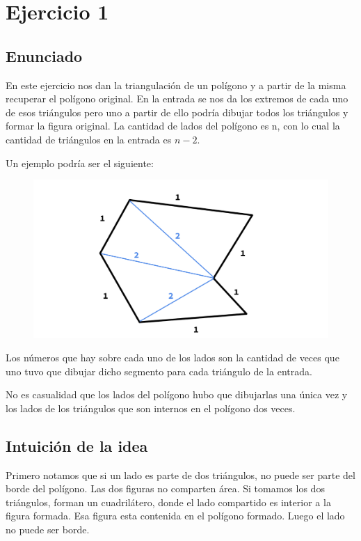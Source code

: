 \section{Ejercicio 1}

\subsection{Enunciado}

En este ejercicio nos dan la triangulación de un polígono y a partir de la misma recuperar el polígono original. En la entrada se nos da los extremos de cada uno de esos triángulos pero uno a partir de ello podría dibujar todos los triángulos y formar la figura original. La cantidad de lados del polígono es n, con lo cual la cantidad de triángulos en la entrada es $n-2$.\newline

Un ejemplo podría ser el siguiente:\newline

\begin{figure}[h!]
	\centering
	\includegraphics[scale = 0.25]{img/poligono-triangulado.png}
\end{figure}

Los números que hay sobre cada uno de los lados son la cantidad de veces que uno tuvo que dibujar dicho segmento para cada triángulo de la entrada.\newline

No es casualidad que los lados del polígono hubo que dibujarlas una única vez y los lados de los triángulos que son internos en el polígono dos veces.\newline

\subsection{Intuición de la idea}
\par{Primero notamos que si un lado es parte de dos triángulos, no puede ser parte del borde del polígono. Las dos figuras no comparten área. Si tomamos los dos triángulos, forman un cuadrilátero, donde el lado compartido es interior a la figura formada. Esa figura esta contenida en el polígono formado. Luego el lado no puede ser borde.}\newline

